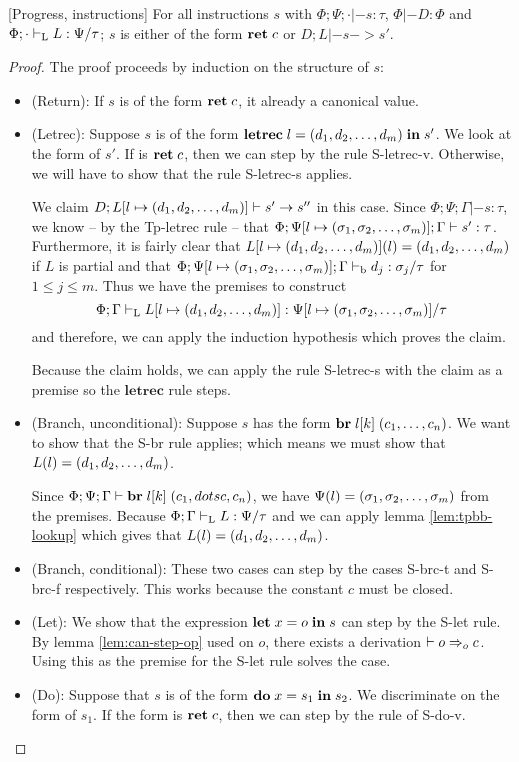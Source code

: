 \documentclass[a4paper, oneside, 10pt, final]{memoir}
\begin{document}
\begin{lem}{[Progress, instructions]}
  \label{lem:progress-instructions}
  For all instructions $s$ with $\Phi;\Psi;\cdot |- s : \tau$, $\Phi
  |- D : \Phi$ and $\Phi;\cdot |-_{\mathrm{L}} L : \Psi / \tau$; $s$ is either
  of the form $\mathbf{ret} \; c$ or $D;L |- s -> s'$.
\end{lem}
\begin{proof}
  The proof proceeds by induction on the structure of $s$:
  \begin{itemize}
  \item (Return): If $s$ is of the form $\mathbf{ret} \; c$, it already a
    canonical value.
  \item (Letrec): Suppose $s$ is of the form
    $\mathbf{letrec} \; l = (d_1, d_2, \dotsc, d_m) \; \mathbf{in} \; s'$. We look at the form of $s'$. If is
    $\mathbf{ret} \; c$, then we can step by the rule S-letrec-v. Otherwise, we
    will have to show that the rule S-letrec-s applies.

    We claim $D;L[l \mapsto (d_1, d_2, \dotsc, d_m)] |- s' -> s''$ in this
    case. Since $\Phi;\Psi;\Gamma |- s : \tau$, we know -- by the
    Tp-letrec rule -- that $\Phi;\Psi[l \mapsto (\sigma_1, \sigma_2, \dotsc, \sigma_m)];\Gamma |- s'
    : \tau$. Furthermore, it is fairly clear that $L[l \mapsto
    (d_1, d_2, \dotsc, d_m)](l) = (d_1, d_2, \dotsc, d_m)$ if $L$ is partial and that $\Phi;\Psi[l
    \mapsto (\sigma_1, \sigma_2, \dotsc, \sigma_m)];\Gamma |-_{\mathrm{b}} d_j : \sigma_j / \tau$ for $1 \leq j
    \leq m$. Thus we have the premises to construct
    \begin{equation*}
      \Phi;\Gamma |-_{\mathrm{L}} L[l \mapsto (d_1, d_2, \dotsc, d_m)] : \Psi[l \mapsto (\sigma_1, \sigma_2, \dotsc, \sigma_m)] / \tau
    \end{equation*}
    and therefore, we can apply the induction hypothesis which proves the claim.

    Because the claim holds, we can apply the rule S-letrec-s with the
    claim as a premise so the $\mathbf{letrec}$ rule steps.
  \item (Branch, unconditional): Suppose $s$ has the form $\mathbf{br} \; l[k] \; (c_1, \dotsc,
      c_n)$. We want to show that the S-br rule applies; which means
    we must show that $L(l) = (d_1, d_2, \dotsc, d_m)$.

    Since $\Phi;\Psi;\Gamma |- \mathbf{br} \; l[k] \; (c_1, dotsc, c_n)$, we have
    $\Psi(l) = (\sigma_1, \sigma_2, \dotsc, \sigma_m)$ from the premises. Because $\Phi;\Gamma |-_{\mathrm{L}}
    L : \Psi / \tau$ and we can apply lemma
    \ref{lem:tpbb-lookup} which gives that $L(l) = (d_1, d_2, \dotsc, d_m)$.

  \item (Branch, conditional): These two cases can step by the cases
    S-brc-t and S-brc-f respectively. This works because the constant
    $c$ must be closed.
  \item (Let): We show that the expression $\mathbf{let} \; x = o \; \mathbf{in} \; s$ can step
    by the S-let rule. By lemma \ref{lem:can-step-op} used on $o$,
    there exists a derivation $|- o =>_{o} c$. Using this as the premise
    for the S-let rule solves the case.
  \item (Do): Suppose that $s$ is of the form $\mathbf{do} \; x = s_1 \; \mathbf{in} \; s_2$. We
    discriminate on the form of $s_1$. If the form is $\mathbf{ret} \; c$, then
    we can step by the rule of S-do-v.


\end{itemize}
\end{proof}
\end{document}
